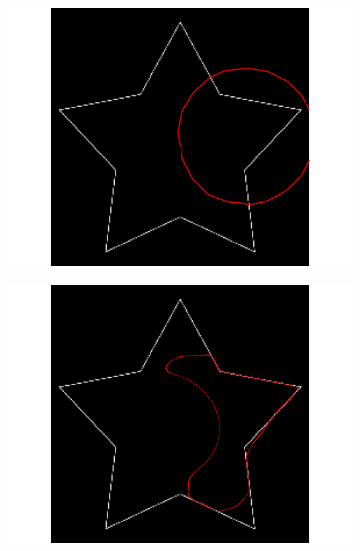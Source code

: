 \begin{appendices}
\begin{figure}[H]
\begin{subfigure}[c]{0.3\linewidth}
\centering
\includegraphics[width=\textwidth]{Chapters/Images/Init/vfcusym1}
\caption{}
\end{subfigure}
\begin{subfigure}[c]{0.3\linewidth}
\centering
\includegraphics[width=\textwidth]{Chapters/Images/Init/vfcusym2}
\caption{}
\end{subfigure}
\begin{subfigure}[c]{0.3\linewidth}
\centering

\end{subfigure}
\end{figure}
\end{appendices}
